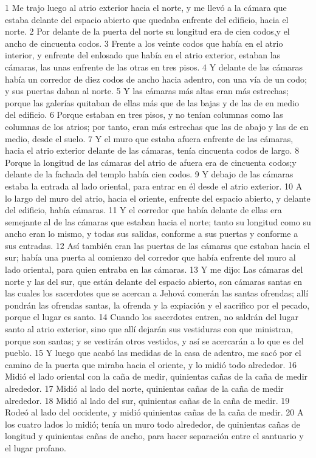 1 Me trajo luego al atrio exterior hacia el norte, y me llevó a la cámara que estaba delante del espacio abierto que quedaba enfrente del edificio, hacia el norte.
2 Por delante de la puerta del norte su longitud era de cien codos,y el ancho de cincuenta codos.
3 Frente a los veinte codos que había en el atrio interior, y enfrente del enlosado que había en el atrio exterior, estaban las cámaras, las unas enfrente de las otras en tres pisos.
4 Y delante de las cámaras había un corredor de diez codos de ancho hacia adentro, con una vía de un codo; y sus puertas daban al norte.
5 Y las cámaras más altas eran más estrechas; porque las galerías quitaban de ellas más que de las bajas y de las de en medio del edificio.
6 Porque estaban en tres pisos, y no tenían columnas como las columnas de los atrios; por tanto, eran más estrechas que las de abajo y las de en medio, desde el suelo.
7 Y el muro que estaba afuera enfrente de las cámaras, hacia el atrio exterior delante de las cámaras, tenía cincuenta codos de largo.
8 Porque la longitud de las cámaras del atrio de afuera era de cincuenta codos;y delante de la fachada del templo había cien codos.
9 Y debajo de las cámaras estaba la entrada al lado oriental, para entrar en él desde el atrio exterior.
10 A lo largo del muro del atrio, hacia el oriente, enfrente del espacio abierto, y delante del edificio, había cámaras.
11 Y el corredor que había delante de ellas era semejante al de las cámaras que estaban hacia el norte; tanto su longitud como su ancho eran lo mismo, y todas sus salidas, conforme a sus puertas y conforme a sus entradas.
12 Así también eran las puertas de las cámaras que estaban hacia el sur; había una puerta al comienzo del corredor que había enfrente del muro al lado oriental, para quien entraba en las cámaras.
13 Y me dijo: Las cámaras del norte y las del sur, que están delante del espacio abierto, son cámaras santas en las cuales los sacerdotes que se acercan a Jehová comerán las santas ofrendas; allí pondrán las ofrendas santas, la ofrenda y la expiación y el sacrifico por el pecado, porque el lugar es santo.
14 Cuando los sacerdotes entren, no saldrán del lugar santo al atrio exterior, sino que allí dejarán sus vestiduras con que ministran, porque son santas; y se vestirán otros vestidos, y así se acercarán a lo que es del pueblo.
15 Y luego que acabó las medidas de la casa de adentro, me sacó por el camino de la puerta que miraba hacia el oriente, y lo midió todo alrededor.
16 Midió el lado oriental con la caña de medir, quinientas cañas de la caña de medir alrededor.
17 Midió al lado del norte, quinientas cañas de la caña de medir alrededor.
18 Midió al lado del sur, quinientas cañas de la caña de medir.
19 Rodeó al lado del occidente, y midió quinientas cañas de la caña de medir.
20 A los cuatro lados lo midió; tenía un muro todo alrededor, de quinientas cañas de longitud y quinientas cañas de ancho, para hacer separación entre el santuario y el lugar profano. 

